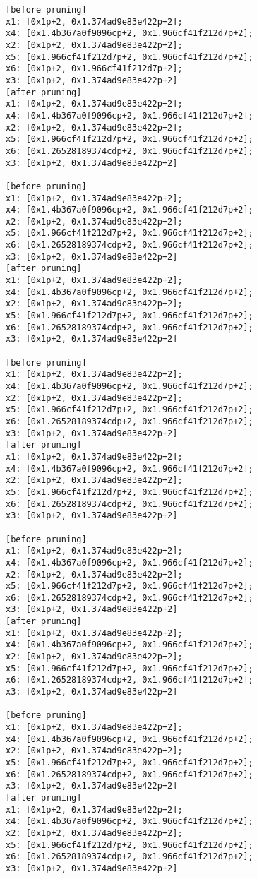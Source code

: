 \begin{lstlisting}
[before pruning]
x1: [0x1p+2, 0x1.374ad9e83e422p+2];
x4: [0x1.4b367a0f9096cp+2, 0x1.966cf41f212d7p+2];
x2: [0x1p+2, 0x1.374ad9e83e422p+2];
x5: [0x1.966cf41f212d7p+2, 0x1.966cf41f212d7p+2];
x6: [0x1p+2, 0x1.966cf41f212d7p+2];
x3: [0x1p+2, 0x1.374ad9e83e422p+2]
[after pruning]
x1: [0x1p+2, 0x1.374ad9e83e422p+2];
x4: [0x1.4b367a0f9096cp+2, 0x1.966cf41f212d7p+2];
x2: [0x1p+2, 0x1.374ad9e83e422p+2];
x5: [0x1.966cf41f212d7p+2, 0x1.966cf41f212d7p+2];
x6: [0x1.26528189374cdp+2, 0x1.966cf41f212d7p+2];
x3: [0x1p+2, 0x1.374ad9e83e422p+2]

[before pruning]
x1: [0x1p+2, 0x1.374ad9e83e422p+2];
x4: [0x1.4b367a0f9096cp+2, 0x1.966cf41f212d7p+2];
x2: [0x1p+2, 0x1.374ad9e83e422p+2];
x5: [0x1.966cf41f212d7p+2, 0x1.966cf41f212d7p+2];
x6: [0x1.26528189374cdp+2, 0x1.966cf41f212d7p+2];
x3: [0x1p+2, 0x1.374ad9e83e422p+2]
[after pruning]
x1: [0x1p+2, 0x1.374ad9e83e422p+2];
x4: [0x1.4b367a0f9096cp+2, 0x1.966cf41f212d7p+2];
x2: [0x1p+2, 0x1.374ad9e83e422p+2];
x5: [0x1.966cf41f212d7p+2, 0x1.966cf41f212d7p+2];
x6: [0x1.26528189374cdp+2, 0x1.966cf41f212d7p+2];
x3: [0x1p+2, 0x1.374ad9e83e422p+2]

[before pruning]
x1: [0x1p+2, 0x1.374ad9e83e422p+2];
x4: [0x1.4b367a0f9096cp+2, 0x1.966cf41f212d7p+2];
x2: [0x1p+2, 0x1.374ad9e83e422p+2];
x5: [0x1.966cf41f212d7p+2, 0x1.966cf41f212d7p+2];
x6: [0x1.26528189374cdp+2, 0x1.966cf41f212d7p+2];
x3: [0x1p+2, 0x1.374ad9e83e422p+2]
[after pruning]
x1: [0x1p+2, 0x1.374ad9e83e422p+2];
x4: [0x1.4b367a0f9096cp+2, 0x1.966cf41f212d7p+2];
x2: [0x1p+2, 0x1.374ad9e83e422p+2];
x5: [0x1.966cf41f212d7p+2, 0x1.966cf41f212d7p+2];
x6: [0x1.26528189374cdp+2, 0x1.966cf41f212d7p+2];
x3: [0x1p+2, 0x1.374ad9e83e422p+2]

[before pruning]
x1: [0x1p+2, 0x1.374ad9e83e422p+2];
x4: [0x1.4b367a0f9096cp+2, 0x1.966cf41f212d7p+2];
x2: [0x1p+2, 0x1.374ad9e83e422p+2];
x5: [0x1.966cf41f212d7p+2, 0x1.966cf41f212d7p+2];
x6: [0x1.26528189374cdp+2, 0x1.966cf41f212d7p+2];
x3: [0x1p+2, 0x1.374ad9e83e422p+2]
[after pruning]
x1: [0x1p+2, 0x1.374ad9e83e422p+2];
x4: [0x1.4b367a0f9096cp+2, 0x1.966cf41f212d7p+2];
x2: [0x1p+2, 0x1.374ad9e83e422p+2];
x5: [0x1.966cf41f212d7p+2, 0x1.966cf41f212d7p+2];
x6: [0x1.26528189374cdp+2, 0x1.966cf41f212d7p+2];
x3: [0x1p+2, 0x1.374ad9e83e422p+2]

[before pruning]
x1: [0x1p+2, 0x1.374ad9e83e422p+2];
x4: [0x1.4b367a0f9096cp+2, 0x1.966cf41f212d7p+2];
x2: [0x1p+2, 0x1.374ad9e83e422p+2];
x5: [0x1.966cf41f212d7p+2, 0x1.966cf41f212d7p+2];
x6: [0x1.26528189374cdp+2, 0x1.966cf41f212d7p+2];
x3: [0x1p+2, 0x1.374ad9e83e422p+2]
[after pruning]
x1: [0x1p+2, 0x1.374ad9e83e422p+2];
x4: [0x1.4b367a0f9096cp+2, 0x1.966cf41f212d7p+2];
x2: [0x1p+2, 0x1.374ad9e83e422p+2];
x5: [0x1.966cf41f212d7p+2, 0x1.966cf41f212d7p+2];
x6: [0x1.26528189374cdp+2, 0x1.966cf41f212d7p+2];
x3: [0x1p+2, 0x1.374ad9e83e422p+2]


\end{lstlisting}
